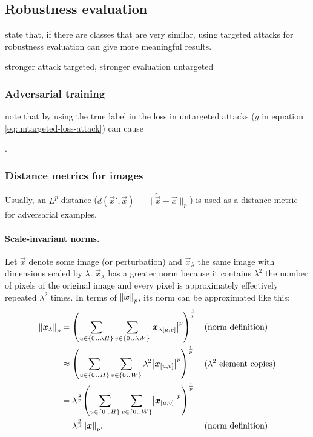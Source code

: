 \documentclass[twocolumn]{article}
\begin{document}
\newpage

\subsection{Robustness evaluation}

\citet{Athalye:2018:OGGFSS} state that, if there are classes that are very similar, using targeted attacks for robustness evaluation can give more meaningful results. 

stronger attack targeted, stronger evaluation untargeted

\subsubsection{Adversarial training}

\citet{Kurakin:2016:AMLS} note that by using the true label in the loss in untargeted attacks ($y$ in equation \eqref{eq:untargeted-loss-attack}) can cause


\newpage
.
\newpage
\subsubsection{Distance metrics for images}

Usually, an $L^p$ distance ($d(\vec x', \vec x)=\lVert\tilde{\vec x}-\vec x\rVert_p$) is used as a distance metric for adversarial examples.

\paragraph{Scale-invariant norms.}
Let $\vec x$ denote some image (or perturbation) and $\vec x_\lambda$ the same image with dimensions scaled by $\lambda$. $\vec x_\lambda$ has a greater norm because it contains $\lambda^2$ the number of pixels of the original image and every pixel is approximately effectively repeated $\lambda^2$ times. In terms of $\enVert{\vec x}_p$, its norm can be approximated like this:
\begin{align*}
    \enVert{\vec x_\lambda}_p 
    &= \del{\sum_{u\in\cbr{0\bidot\lambda H}}\sum_{v\in\cbr{0\bidot\lambda W}} \envert{{\vec x_\lambda}_\ind{u, v}}^p}^{\frac{1}{p}} && \text{(norm definition)} \\
    &\approx \del{\sum_{u\in\cbr{0\bidot H}}\sum_{v\in\cbr{0\bidot W}} \lambda^2 \envert{{\vec x}_\ind{u, v}}^p}^{\frac{1}{p}} && \text{($\lambda^2$ element copies)} \\
    &= \lambda^\frac{2}{p} \del{\sum_{u\in\cbr{0\bidot H}}\sum_{v\in\cbr{0\bidot W}} \envert{{\vec x}_\ind{u, v}}^p}^{\frac{1}{p}} \\
    &= \lambda^\frac{2}{p} \enVert{\vec x}_p \text{.} && \text{(norm definition)}
\end{align*}
\end{document}
